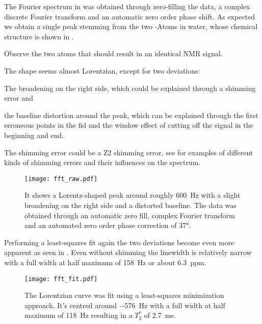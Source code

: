 The Fourier spectrum in  was obtained through zero-filling the data, a complex discrete Fourier transform and an automatic zero order phase shift. As expected we obtain a single peak stemming from the two -Atoms in water, whose chemical structure is shown in .

\begin{marginfigure}
    \centering
    
    \caption{ Observe the two  atoms that should result in an identical NMR signal.}
\end{marginfigure}

The shape seems almost Lorentzian, except for two deviations: %
\begin{enumerate*}[label=(\arabic*)]
    \item The broadening on the right side, which could be explained through a shimming error and
    \item the baseline distortion around the peak, which can be explained through the first erroneous points in the \acrshort{fid} and the window effect of cutting off the signal in the beginning and end.
\end{enumerate*}%
The shimming error could be a Z2 shimming error, see  for examples of different kinds of shimming errors and their influences on the spectrum.

\begin{figure}[h!bt]
    \centering
    \texttt{[image: fft\_raw.pdf]}
    \caption{ It shows a Lorentz-shaped peak around roughly \qty{600}{\hertz} with a slight broadening on the right side and a distorted baseline. The data was obtained through an automatic zero fill, complex Fourier transform and an automated zero order phase correction of \ang{37}.}
\end{figure}

Performing a least-squares fit again the two deviations become even more apparent as seen in . Even without shimming the linewidth is relatively narrow with a full width at half maximum of \qty{158}{\hertz} or about \qty{6.3}{ppm}.

\begin{figure}[h!bt]
    \centering
    \texttt{[image: fft\_fit.pdf]}
    \caption{ The Lorentzian curve was fit using a least-squares minimization approach. It's centred around \qty{-576}{\hertz} with a full width at half maximum of \qty{118}{\hertz} resulting in a \(T_2^*\) of \qty{2.7}{\milli\second}.}
\end{figure}

